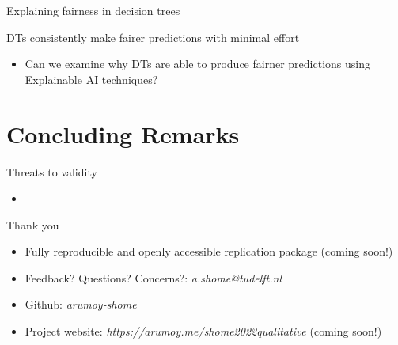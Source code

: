 \documentclass[aspectratio=169]{beamer}
\begin{document}
\begin{frame}{Explaining fairness in decision trees}
  \begin{exampleblock}{DTs consistently make fairer predictions with
    minimal effort}
    \begin{itemize}
      \item Can we examine why DTs are able to produce fairner
        predictions using Explainable AI techniques?
    \end{itemize}
  \end{exampleblock}
\end{frame}

\section{Concluding Remarks} %

\begin{frame}{Threats to validity}
  \begin{itemize}
    \item 
  \end{itemize}
\end{frame}

\begin{frame}{Thank you}
  \begin{itemize}
    \item Fully reproducible and openly accessible replication
      package (coming soon!)
    \item Feedback? Questions? Concerns?: \emph{a.shome@tudelft.nl}
    \item Github: \emph{arumoy-shome}
    \item Project website:
      \emph{https://arumoy.me/shome2022qualitative} (coming soon!)
  \end{itemize}
\end{frame}

%   
%   
\end{document}
